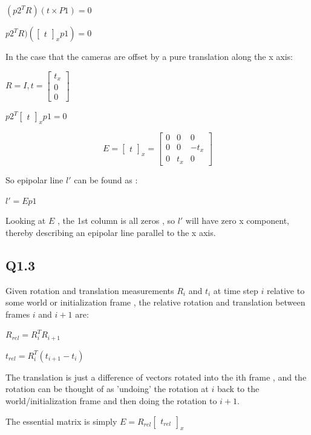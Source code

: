 \documentclass[12pt]{article}
\begin{document}
$(p2^{T} R ) ( t \times P1 ) = 0$  
  
$p2^{T} R ) ( \begin{bmatrix} t \end{bmatrix}_{x} p1 ) = 0$

In the case that the cameras are offset by a pure translation along the x axis:   
  
$R = I , t = \begin{bmatrix} t_{x} \\ 0 \\ 0 \end{bmatrix}$  
  
$p2^{T} \begin{bmatrix} t \end{bmatrix}_{x} p1 = 0$
  
$$
E =
\begin{bmatrix} t \end{bmatrix}_{x}  = 
\begin{bmatrix} 0&0&0 \\ 0&0&-t_{x} \\ 0&t_{x}&0 \end{bmatrix}
$$

So epipolar line $l'$ can be found as :
  
$l' = E p1$

Looking at $E$ , the 1st column is all zeros , so $l'$ will have zero x component, thereby describing an epipolar line parallel to the x axis.

\newpage
\subsection{Q1.3}
Given rotation and translation measurements $R_{i}$ and $t_{i}$ at time step $i$ relative to some world or initialization frame , the relative rotation and translation between frames $i$ and $i+1$ are: 
  
$R_{rel} = R_{i}^{T} R_{i+1}$ 
  
$t_{rel} = R_{i}^{T} ( t_{i+1} - t_{i} )$  
  
The translation is just a difference of vectors rotated into the ith frame , and the rotation can be thought of as 'undoing' the rotation at $i$ back to the world/initialization frame and then doing the rotation to $i+1$.
  
The essential matrix is simply $E = R_{rel} \begin{bmatrix}  t_{rel} \end{bmatrix}_{x}$
  
\end{document}
